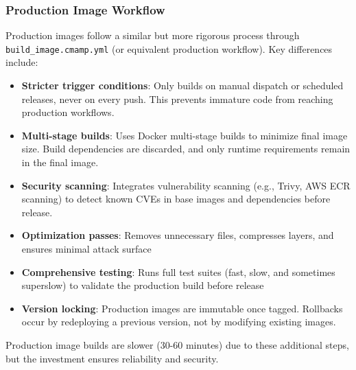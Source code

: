 \subsubsection{Production Image Workflow}
Production images follow a similar but more rigorous process through \texttt{build\_image.cmamp.yml}
(or equivalent production workflow). Key differences include:
\begin{itemize}
  \item \textbf{Stricter trigger conditions}: Only builds on manual dispatch
    or scheduled releases, never on every push. This prevents immature
    code from reaching production workflows.

  \item \textbf{Multi-stage builds}: Uses Docker multi-stage builds to
    minimize final image size. Build dependencies are discarded, and only
    runtime requirements remain in the final image.

  \item \textbf{Security scanning}: Integrates vulnerability scanning (e.g.,
    Trivy, AWS ECR scanning) to detect known CVEs in base images and
    dependencies before release.

  \item \textbf{Optimization passes}: Removes unnecessary files,
    compresses layers, and ensures minimal attack surface

  \item \textbf{Comprehensive testing}: Runs full test suites (fast, slow,
    and sometimes superslow) to validate the production build before release

  \item \textbf{Version locking}: Production images are immutable once
    tagged. Rollbacks occur by redeploying a previous version, not by modifying
    existing images.
\end{itemize}
Production image builds are slower (30-60 minutes) due to these
additional steps, but the investment ensures reliability and security.
